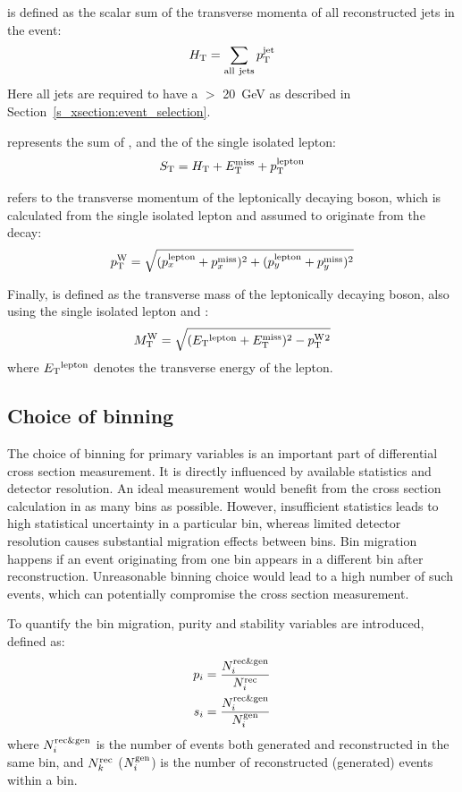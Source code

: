 \HT is defined as the scalar sum of the transverse momenta of all reconstructed jets in the event:
\[H_{\mathrm{T}} = \sum_{\mathrm{all~jets}}p_{\mathrm{T}}^{\mathrm{jet}}\]
Here all jets are required to have a \pt $>$ \SI{20}{\GeV} as described in Section~\ref{s_xsection:event_selection}.

\ST represents the sum of \HT, \MET and the \pt of the single isolated lepton: 
\[S_{\mathrm{T}} = H_{\mathrm{T}} + E_{\mathrm{T}}^{\textrm{miss}} + p_\mathrm{T}^\mathrm{lepton}\]

\WPT refers to the transverse momentum of the leptonically decaying \W boson, which is calculated from the single
isolated lepton and \MET assumed to originate from the \ttbar decay:
\[p_\mathrm{T}^{\mathrm{W}} = \sqrt{(p_x^{\mathrm{lepton}} + p_x^{\mathrm{miss}})^2 + (p_y^{\mathrm{lepton}} + p_y^{\mathrm{miss}})^2}\]

Finally, \MT is defined as the transverse mass of the leptonically decaying \W boson, also using the single isolated
lepton and \MET:
\[M_\mathrm{T}^{\mathrm{W}} = \sqrt{(E_{\mathrm{T}} {}^{\mathrm{lepton}} +E_{\mathrm{T}}^{\textrm{miss}})^2 - p_\mathrm{T}^{\mathrm{W}} {}^2}\]
where $E_{\mathrm{T}} {}^{\mathrm{lepton}}$ denotes the transverse energy of the lepton.

\subsection{Choice of binning}
\label{ss_xsection:binning}

The choice of binning for primary variables is an important part of differential cross section measurement. It is
directly influenced by available statistics and detector resolution. An ideal measurement would benefit from the cross
section calculation in as many bins as possible. However, insufficient statistics leads to high statistical uncertainty
in a particular bin, whereas limited detector resolution causes substantial migration effects between bins. Bin
migration happens if an event originating from one bin appears in a different bin after reconstruction. Unreasonable
binning choice would lead to a high number of such events, which can potentially compromise the cross section
measurement.

To quantify the bin migration, purity and stability variables are introduced, defined as:
\begin{align}
p_i = \frac{N^{\mathrm{rec}\&\mathrm{gen}}_i}{N^{\mathrm{rec}}_i} \\
s_i = \frac{N^{\mathrm{rec}\&\mathrm{gen}}_i}{N^{\mathrm{gen}}_i}
\end{align}
where $N^{\mathrm{rec}\&\mathrm{gen}}_i$ is the number of events both generated and reconstructed in the same bin, and
$N^{\mathrm{rec}}_k$ ($N^{\mathrm{gen}}_i$) is the number of reconstructed (generated) events within a bin.

